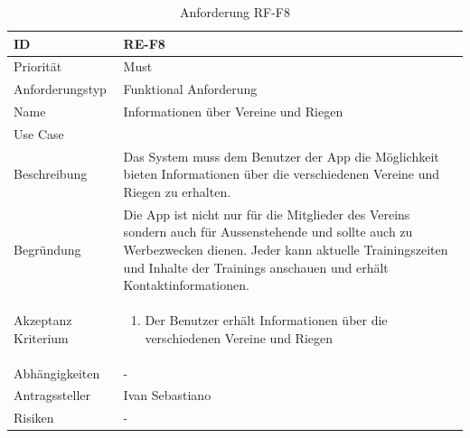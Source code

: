 \begin{table}[ht]
\centering
  \begin{tabular}{ l | p{8cm} }
	\hline
	\rowcolor{gray}
	ID 			&	\textbf{RE-F8}\\ \hline
	Priorität 		&	Must\\ \hline
	Anforderungstyp	&	Funktional Anforderung\\ \hline
	Name 			&	Informationen über Vereine und Riegen\\ \hline
	Use Case 		&	\nameref{table:use_case_6}\\ \hline
	Beschreibung 	&	Das System muss dem Benutzer der App die Möglichkeit bieten Informationen über die verschiedenen Vereine und Riegen zu erhalten.\\ \hline
	Begründung 		&	Die App ist nicht nur für die Mitglieder des Vereins sondern auch für Aussenstehende und sollte auch zu Werbezwecken dienen. Jeder kann aktuelle Trainingszeiten und Inhalte der Trainings anschauen und erhält Kontaktinformationen.\\ \hline
	Akzeptanz Kriterium	&	\begin{enumerate}
					\item Der Benutzer erhält Informationen über die verschiedenen Vereine und Riegen
					\end{enumerate}
					\\ \hline
	Abhängigkeiten 	&	-\\ \hline
	Antragssteller 	&	Ivan Sebastiano\\ \hline
	Risiken	 	&	-
  \end{tabular}
   \caption{Anforderung RF-F8}\label{table:req_8}
\end{table}

